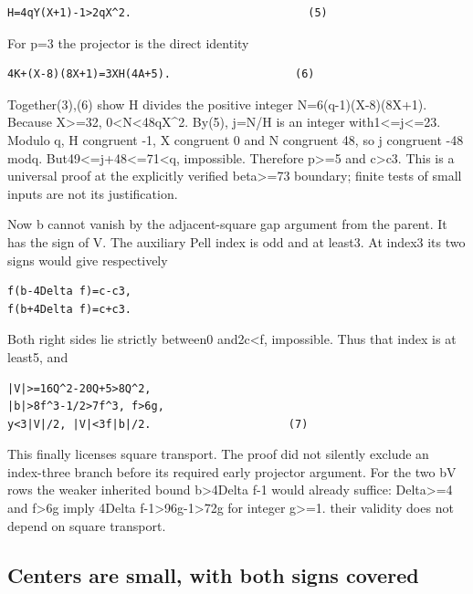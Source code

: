 \begin{verbatim}
H=4qY(X+1)-1>2qX^2.                           (5)
\end{verbatim}

For p=3 the projector is the direct identity

\begin{verbatim}
4K+(X-8)(8X+1)=3XH(4A+5).                   (6)
\end{verbatim}

Together(3),(6) show H divides the positive integer N=6(q-1)(X-8)(8X+1).
Because X\textgreater=32, 0\textless N\textless48qX\^{}2. By(5), j=N/H
is an integer with1\textless=j\textless=23. Modulo q, H congruent -1, X
congruent 0 and N congruent 48, so j congruent -48 modq.
But49\textless=j+48\textless=71\textless q, impossible. Therefore
p\textgreater=5 and c\textgreater c3. This is a universal proof at the
explicitly verified beta\textgreater=73 boundary; finite tests of small
inputs are not its justification.

Now b cannot vanish by the adjacent-square gap argument from the parent.
It has the sign of V. The auxiliary Pell index is odd and at least3. At
index3 its two signs would give respectively

\begin{verbatim}
f(b-4Delta f)=c-c3,
f(b+4Delta f)=c+c3.
\end{verbatim}

Both right sides lie strictly between0 and2c\textless f, impossible.
Thus that index is at least5, and

\begin{verbatim}
|V|>=16Q^2-20Q+5>8Q^2,
|b|>8f^3-1/2>7f^3, f>6g,
y<3|V|/2, |V|<3f|b|/2.                     (7)
\end{verbatim}

This finally licenses square transport. The proof did not silently
exclude an index-three branch before its required early projector
argument. For the two bV rows the weaker inherited bound
\textbar b\textbar\textgreater4Delta f-1 would already suffice:
Delta\textgreater=4 and f\textgreater6g imply 4Delta
f-1\textgreater96g-1\textgreater72g for integer g\textgreater=1. their
validity does not depend on square transport.

\subsection{Centers are small, with both signs
covered}\label{centers-are-small-with-both-signs-covered}

